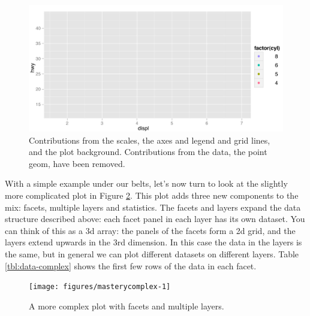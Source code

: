 \begin{figure}[htbp]
  \centering
  \includegraphics[width=0.8\linewidth]{diagrams/empty}
  \caption{Contributions from the scales, the axes and legend and grid lines, and the plot background.  Contributions from the data, the point geom, have been removed.}
  \label{fig:empty}
\end{figure}


With a simple example under our belts, let's now turn to look at the
slightly more complicated plot in Figure \ref{fig:complex}. This plot
adds three new components to the mix: facets, multiple layers and
statistics. The facets and layers expand the data structure described
above: each facet panel in each layer has its own dataset. You can think
of this as a 3d array: the panels of the facets form a 2d grid, and the
layers extend upwards in the 3rd dimension. In this case the data in the
layers is the same, but in general we can plot different datasets on
different layers. Table \ref{tbl:data-complex} shows the first few rows
of the data in each facet.

\begin{Shaded}
\begin{Highlighting}[]
 \StringTok{ }\StringTok{ }\NormalTok{()}
\end{Highlighting}
\end{Shaded}

\begin{figure}

{\centering \texttt{[image: figures/masterycomplex-1]} 

}

\caption{A more complex plot with facets and multiple layers.\label{fig:complex}}
\end{figure}

